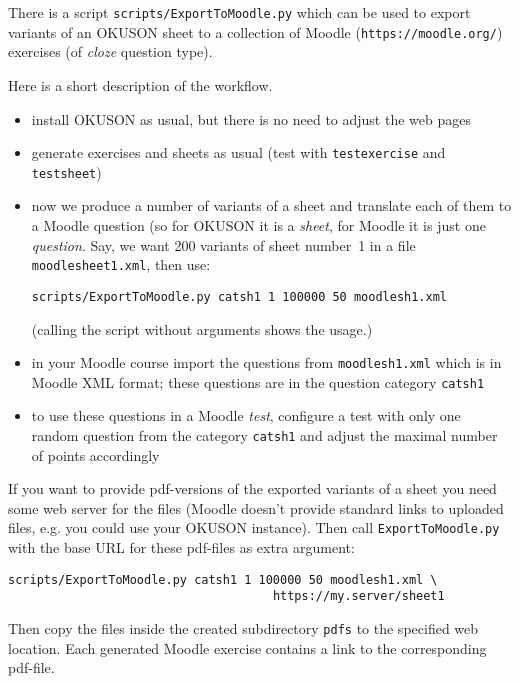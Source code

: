 \documentclass[12pt,openany,a4paper]{book}
\begin{document}
There is a script \texttt{scripts/ExportToMoodle.py} which can be used
to export variants of an OKUSON sheet to a collection of Moodle 
(\texttt{https://moodle.org/}) exercises (of \textit{cloze} question type).

Here is a short description of the workflow. 

\begin{itemize}
\item install OKUSON as usual, but there is no need to adjust the
web pages
\item generate exercises and sheets as usual (test with
\texttt{testexercise} and \texttt{testsheet})
\item now we produce a number of variants of a sheet and translate each of
them to a Moodle question (so for OKUSON it is a \textit{sheet}, for Moodle 
it is just one \textit{question}. Say, we want 200 variants of sheet
number~1 in a file \texttt{moodlesheet1.xml}, then use:

\begin{verbatim}
scripts/ExportToMoodle.py catsh1 1 100000 50 moodlesh1.xml 
\end{verbatim}
(calling the script without arguments shows the usage.)

\item in your Moodle course import the questions from \texttt{moodlesh1.xml}
which is in Moodle XML format; these questions are in the question category
\texttt{catsh1} 

\item to use these questions in a Moodle \textit{test}, configure a test 
with only one random question from the category \texttt{catsh1} and adjust
the maximal number of points accordingly
\end{itemize}

If you want to provide pdf-versions of the exported variants of a sheet you
need some web server for the files (Moodle doesn't provide standard links to
uploaded files, e.g. you could use your OKUSON instance). 
Then call \texttt{ExportToMoodle.py} with the base URL for
these pdf-files as extra argument:

\begin{verbatim}
scripts/ExportToMoodle.py catsh1 1 100000 50 moodlesh1.xml \
                                     https://my.server/sheet1
\end{verbatim}

Then copy the files inside the created subdirectory \texttt{pdfs} to the
specified web location. Each generated Moodle exercise contains a link to
the corresponding pdf-file.
\end{document}
